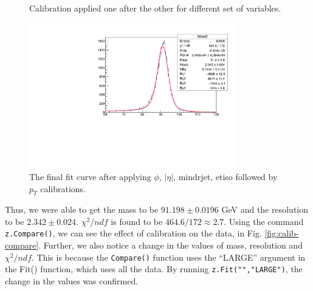 \documentclass[a4paper]{report}
\numberwithin{equation}{section}
\begin{document}
\begin{figure}[htb!]
	\quad
	\centering
	\caption{Calibration applied one after the other for different set of variables.}
	\label{fig:calib-process}
\end{figure}

\begin{figure}[htpb]
    \centering
    \includegraphics[width=0.8\textwidth]{final_calib_fit}
    \caption{The final fit curve after applying $\phi$, $|\eta|$, mindrjet, etiso followed by $p_T$ calibrations.}
    \label{fig:final-calib}
\end{figure}

Thus, we were able to get the mass to be $91.198 \pm 0.0196$ GeV and the resolution to be $2.342 \pm 0.024$. $\chi^2/ndf$ is found to be $464.6 / 172 \approx 2.7$. Using the command \texttt{z.Compare()}, we can see the effect of calibration on the data, in Fig. \ref{fig:calib-compare}. Further, we also notice a change in the values of mass, resolution and $\chi^2/ndf$. This is because the \texttt{Compare()} function uses the ``LARGE'' argument in the Fit() function, which uses all the data. By running \texttt{z.Fit("","LARGE")}, the change in the values was confirmed. 
\end{document}
